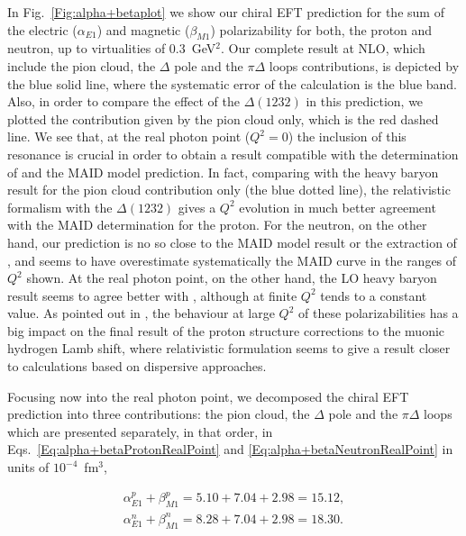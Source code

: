 \documentclass[prc,twocolumn,showpacs,preprintnumbers,amsmath,amssymb
,superscriptaddress,a4paper,nofootinbib
]{revtex4-1}
\begin{document}
In Fig.~\ref{Fig:alpha+betaplot} we show our chiral EFT prediction for the sum of the electric ($\alpha_{E1}$) and magnetic ($\beta_{M1}$) polarizability for both, the proton and neutron, up to virtualities of $0.3$~GeV$^2$.
Our complete result at NLO, which include the pion cloud, the $\Delta$ pole and the $\pi \Delta$ loops contributions, is depicted by the blue solid line, where the systematic error of the calculation is the blue band.
Also, in order to compare the effect of the $\Delta(1232)$ in this prediction, we plotted the contribution given by the pion cloud only, which is the red dashed line. 
We see that, at the real photon point ($Q^2=0$) the inclusion of this resonance is crucial in order to obtain a result compatible with the determination of \cite{Babusci:1997ij} and the MAID model prediction.
In fact, comparing with the heavy baryon result for the pion cloud contribution only (the blue dotted line), the relativistic formalism with the $\Delta(1232)$ gives a $Q^2$ evolution in much better agreement with the MAID determination for the proton.
For the neutron, on the other hand, our prediction is no so close to the MAID model result or the extraction of \cite{Babusci:1997ij}, and seems to have overestimate systematically the MAID curve in the ranges of $Q^2$ shown.
At the real photon point, on the other hand, the LO heavy baryon result seems to agree better with \cite{Babusci:1997ij}, although at finite $Q^2$ tends to a constant value.
As pointed out in \cite{Alarcon:2013cba}, the behaviour at large $Q^2$ of these polarizabilities has a big impact on the final result of the proton structure corrections to the muonic hydrogen Lamb shift, where relativistic formulation seems to give a result closer to calculations based on dispersive approaches.
 
Focusing now into the real photon point, we decomposed the chiral EFT prediction into three contributions:  the pion cloud, the $\Delta$ pole and the $\pi \Delta$ loops which are presented separately, in that order, in Eqs.~\eqref{Eq:alpha+betaProtonRealPoint} and \eqref{Eq:alpha+betaNeutronRealPoint} in units of $10^{-4}$~fm$^3$, 

\begin{align}
\alpha_{E1}^p+\beta_{M1}^p = 5.10+7.04+2.98=15.12, \label{Eq:alpha+betaProtonRealPoint}\\
\alpha_{E1}^n+\beta_{M1}^n = 8.28+7.04+2.98=18.30. \label{Eq:alpha+betaNeutronRealPoint}
\end{align}
\end{document}
